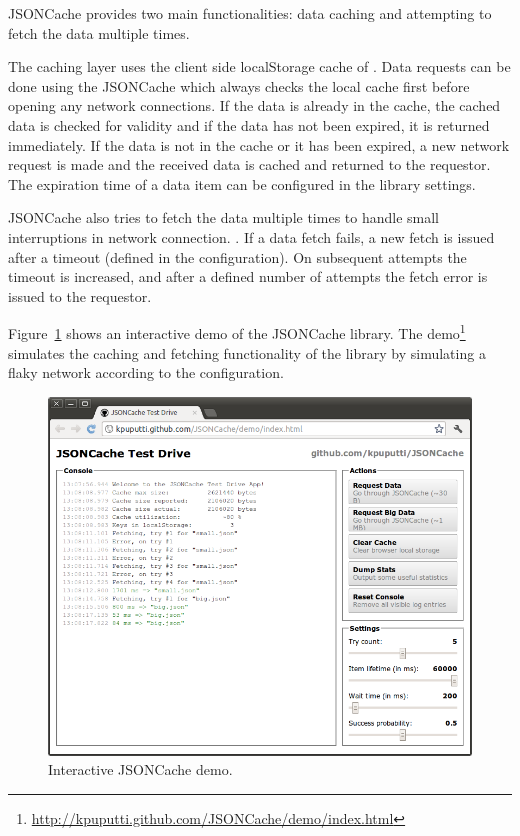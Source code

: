 JSONCache provides two main functionalities: data caching and
attempting to fetch the data multiple times.

The caching layer uses the client side localStorage \citationneeded
cache of . Data requests can be done using the JSONCache
 which always checks the local cache first before opening
any network connections. If the data is already in the cache, the
cached data is checked for validity and if the data has not been
expired, it is returned immediately. If the data is not in the cache
or it has been expired, a new network request is made and the received
data is cached and returned to the requestor. The expiration time of a
data item can be configured in the library settings.

JSONCache also tries to fetch the data multiple times to handle small
interruptions in network connection. . If a data fetch fails, a new fetch is
issued after a timeout (defined in the configuration). On subsequent
attempts the timeout is increased, and after a defined number of
attempts the fetch error is issued to the requestor.

Figure~\ref{figure:jsoncache-demo.png} shows an interactive demo of
the JSONCache library. The
demo\footnote{\url{http://kpuputti.github.com/JSONCache/demo/index.html}}
simulates the caching and fetching functionality of the library by
simulating a flaky network according to the configuration.

\begin{figure}[ht]
  \begin{center}
    \includegraphics[width=\textwidth]{images/jsoncache-demo.png}
    \caption{Interactive JSONCache demo.}
    \label{figure:jsoncache-demo.png}
  \end{center}
\end{figure}
